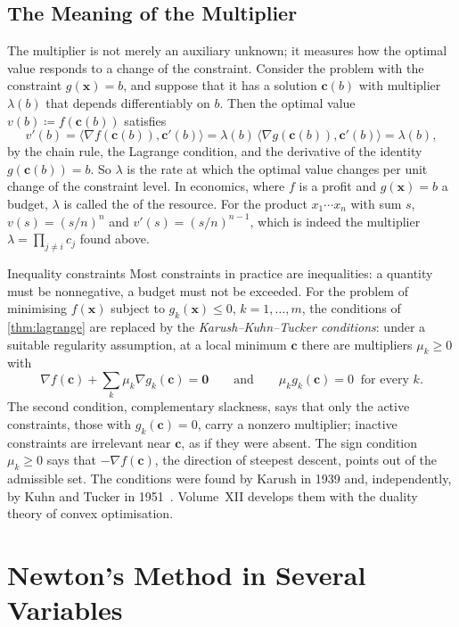 \subsection{The Meaning of the Multiplier}

The multiplier is not merely an auxiliary unknown; it measures how the optimal value responds to a change of the constraint. Consider the problem with the constraint $g(\mathbf x)=b$, and suppose that it has a solution $\mathbf c(b)$ with multiplier $\lambda(b)$ that depends differentiably on $b$. Then the optimal value $v(b)\coloneqq f(\mathbf c(b))$ satisfies
\[
v'(b)=\langle\nabla f(\mathbf c(b)),\mathbf c'(b)\rangle=\lambda(b)\,\langle\nabla g(\mathbf c(b)),\mathbf c'(b)\rangle=\lambda(b),
\]
by the chain rule, the Lagrange condition, and the derivative of the identity $g(\mathbf c(b))=b$. So $\lambda$ is the rate at which the optimal value changes per unit change of the constraint level. In economics, where $f$ is a profit and $g(\mathbf x)=b$ a budget, $\lambda$ is called the  of the resource. For the product $x_1\cdots x_n$ with sum $s$, $v(s)=(s/n)^n$ and $v'(s)=(s/n)^{n-1}$, which is indeed the multiplier $\lambda=\prod_{j\ne i}c_j$ found above.

\begin{note}{Inequality constraints}
Most constraints in practice are inequalities: a quantity must be nonnegative, a budget must not be exceeded. For the problem of minimising $f(\mathbf x)$ subject to $g_k(\mathbf x)\le0$, $k=1,\ldots,m$, the conditions of \cref{thm:lagrange} are replaced by the \emph{Karush--Kuhn--Tucker conditions}: under a suitable regularity assumption, at a local minimum $\mathbf c$ there are multipliers $\mu_k\ge0$ with
\[
\nabla f(\mathbf c)+\sum_k\mu_k\nabla g_k(\mathbf c)=\mathbf0\qquad\text{and}\qquad\mu_kg_k(\mathbf c)=0\ \text{ for every }k .
\]
The second condition, complementary slackness, says that only the active constraints, those with $g_k(\mathbf c)=0$, carry a nonzero multiplier; inactive constraints are irrelevant near $\mathbf c$, as if they were absent. The sign condition $\mu_k\ge0$ says that $-\nabla f(\mathbf c)$, the direction of steepest descent, points out of the admissible set. The conditions were found by Karush in 1939 and, independently, by Kuhn and Tucker in 1951~\cite{karush1939,kuhn1951}. Volume~XII develops them with the duality theory of convex optimisation.
\end{note}

\section{Newton's Method in Several Variables}
\label{sec:newton-n}


